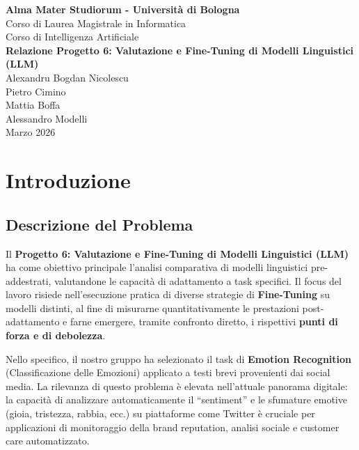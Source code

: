 \documentclass[a4paper,12pt]{article}
\begin{document}
\begin{titlepage}
    \begin{center}
        \vspace*{5cm}
        {\Large \textbf{Alma Mater Studiorum - Università di Bologna}}\\[0.3cm]
        {\large Corso di Laurea Magistrale in Informatica}\\[0.5cm]

        {\large Corso di Intelligenza Artificiale}\\[2cm]

        {\LARGE \textbf{Relazione Progetto 6: Valutazione e Fine-Tuning di Modelli Linguistici (LLM)}}\\[2cm]

        {\large
        Alexandru Bogdan Nicolescu \\
        Pietro Cimino \\
        Mattia Boffa \\
        Alessandro Modelli
        }\\[2cm]

        {\large Marzo 2026}\\[0.5cm]
        \vfill
    \end{center}
\end{titlepage}

\section{Introduzione}

\subsection{Descrizione del Problema}
Il \textbf{Progetto 6: Valutazione e Fine-Tuning di Modelli Linguistici (LLM)} ha come obiettivo principale l'analisi comparativa
di modelli linguistici pre-addestrati, valutandone le capacità di adattamento a task specifici. Il focus del lavoro risiede
nell'esecuzione pratica di diverse strategie di \textbf{Fine-Tuning} su modelli distinti, al fine di misurarne quantitativamente
le prestazioni post-adattamento e farne emergere, tramite confronto diretto, i rispettivi \textbf{punti di forza e di debolezza}.

Nello specifico, il nostro gruppo ha selezionato il task di \textbf{Emotion Recognition} (Classificazione delle Emozioni) applicato
a testi brevi provenienti dai social media. La rilevanza di questo problema è elevata nell'attuale panorama digitale: la capacità
di analizzare automaticamente il ``sentiment'' e le sfumature emotive (gioia, tristezza, rabbia, ecc.) su piattaforme come Twitter
è cruciale per applicazioni di monitoraggio della brand reputation, analisi sociale e customer care automatizzato.
\end{document}
